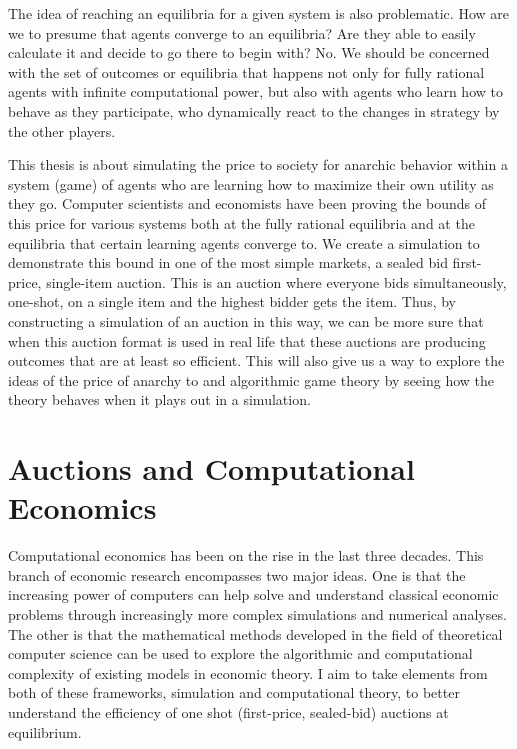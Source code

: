 \documentclass[12pt,twoside]{reedthesis}
\begin{document}
The idea of reaching an equilibria for a given system is also problematic. How are we to presume that agents converge to an equilibria? Are they able to easily calculate it and decide to go there to begin with? No. We should be concerned with the set of outcomes or equilibria that happens not only for fully rational agents with infinite computational power, but also with agents who learn how to behave as they participate, who dynamically react to the changes in strategy by the other players. 

This thesis is about simulating the price to society for anarchic behavior within a system (game) of agents who are learning how to maximize their own utility as they go. Computer scientists and economists have been proving the bounds of this price for various systems both at the fully rational equilibria and at the equilibria that certain learning agents converge to. We create a simulation to demonstrate this bound in one of the most simple markets, a sealed bid first-price, single-item auction. This is an auction where everyone bids simultaneously, one-shot, on a single item and the highest bidder gets the item. Thus, by constructing a simulation of an auction in this way, we can be more sure that when this auction format is used in real life that these auctions are producing outcomes that are at least so efficient. This will also give us a way to explore the ideas of the price of anarchy to and algorithmic game theory by seeing how the theory behaves when it plays out in a simulation.
	 
	
\chapter{Auctions and Computational Economics}
	Computational economics has been on the rise in the last three decades. This branch of economic research encompasses two major ideas. One is that the increasing power of computers can help solve and understand classical economic problems through increasingly more complex simulations and numerical analyses. The other is that the mathematical methods developed in the field of theoretical computer science can be used to explore the algorithmic and computational complexity of existing models in economic theory. I aim to take elements from both of these frameworks, simulation and computational theory, to better understand the efficiency of one shot (first-price, sealed-bid) auctions at equilibrium. 
\end{document}
